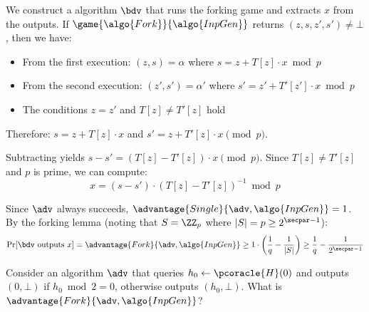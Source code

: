 \ifsolutions
\begin{mysolution}
  We construct a \ppt algorithm $\bdv$ that runs the forking game and extracts $x$ from the outputs.
  If $\game{\algo{Fork}}{\algo{InpGen}}$ returns $(z, s, z', s') \neq \bot$, then we have:
  \begin{itemize}
    \item From the first execution: $(z, s) = \alpha$ where $s = z + T[z] \cdot x \bmod p$
    \item From the second execution: $(z', s') = \alpha'$ where $s' = z' + T'[z'] \cdot x \bmod p$
    \item The conditions $z = z'$ and $T[z] \neq T'[z]$ hold
  \end{itemize}
  
  Therefore: $s = z + T[z] \cdot x$ and $s' = z + T'[z] \cdot x \pmod{p}$.
  
  Subtracting yields $s - s' = (T[z] - T'[z]) \cdot x \pmod{p}$. Since $T[z] \neq T'[z]$ and $p$ is prime, we can compute:
  \[
  x = (s - s') \cdot (T[z] - T'[z])^{-1} \bmod p
  \]
  
  Since $\adv$ always succeeds, $\advantage{Single}{\adv, \algo{InpGen}} = 1$. By the forking lemma (noting that $S = \ZZ_p$ where $|S| = p \geq 2^{\secpar-1}$):
  \[
  \Pr[\bdv \text{ outputs } x] = \advantage{Fork}{\adv, \algo{InpGen}} \geq 1 \cdot \left(\frac{1}{q} - \frac{1}{|S|}\right) \geq \frac{1}{q} - \frac{1}{2^{\secpar-1}}
  \]
\end{mysolution}
\fi

\begin{exercise}
  Consider an algorithm $\adv$ that queries $h_0 \gets \pcoracle{H}(0)$ and outputs $(0, \bot)$ if $h_0 \bmod 2 = 0$, otherwise outputs $(h_0, \bot)$. What is $\advantage{Fork}{\adv, \algo{InpGen}}$?
\end{exercise}

